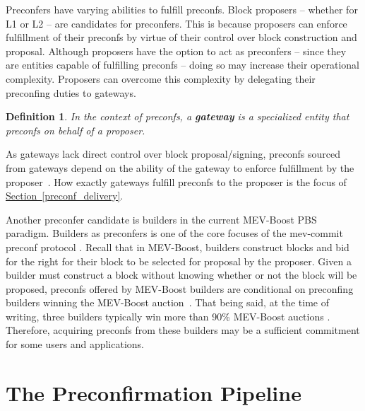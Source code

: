 \documentclass[a4paper]{article}
\theoremstyle{boldstyle}
\newtheorem{definitionx}{Definition}
\newenvironment{definition}
  {\begin{defopenboxq}\begin{definitionx}}
  {\end{definitionx}\end{defopenboxq}}
\begin{document}
        Preconfers have varying abilities to fulfill preconfs. Block proposers -- whether for L1 or L2 -- are candidates for preconfers. This is because proposers can enforce fulfillment of their preconfs by virtue of their control over block construction and proposal.
        Although proposers have the option to act as preconfers -- since they are entities capable of fulfilling preconfs -- doing so may increase their operational complexity.
        Proposers can overcome this complexity by delegating their preconfing duties to gateways.
        \begin{definition}
        \label{def:preconfirmation}
        In the context of preconfs, a \textbf{gateway} is a specialized entity that preconfs on behalf of a proposer.
        \end{definition}
        As gateways lack direct control over block proposal/signing, preconfs sourced from gateways depend on the ability of the gateway to enforce fulfillment by the proposer~\cite{W:ThePreconfirmationGatewayUnlockingPreconfirmations:FromUsertoPreconfer, W:Ahead-of-TimeBlockAuctionsToEnableExecutionPreconfirmations,W:DelegationinBolt:OutsourcingSophisticationWhilePreservingDecentralization}. How exactly gateways fulfill preconfs to the proposer is the focus of \hyperref[preconf_delivery]{Section~\ref{preconf_delivery}}.
        
        Another preconfer candidate is builders in the current MEV-Boost PBS paradigm. Builders as preconfers is one of the core focuses of the mev-commit preconf protocol \cite{W:Documentation-Understandingmev-commit}. Recall that in MEV-Boost, builders construct blocks and bid for the right for their block to be selected for proposal by the proposer. Given a builder must construct a block without knowing whether or not the block will be proposed, preconfs offered by MEV-Boost builders are conditional on preconfing builders winning the MEV-Boost auction~\cite{W:PreconfirmationFairExchange,W:LeaderlessandLeader-BasedPreconfirmations}. That being said,
        at the time of writing, three builders typically win more than 90\% MEV-Boost auctions \cite{MEV.pics}. Therefore, acquiring preconfs from these builders may be a sufficient commitment for some users and applications. 
    
\section{The Preconfirmation Pipeline}
\label{sec:pipeline}
\end{document}
